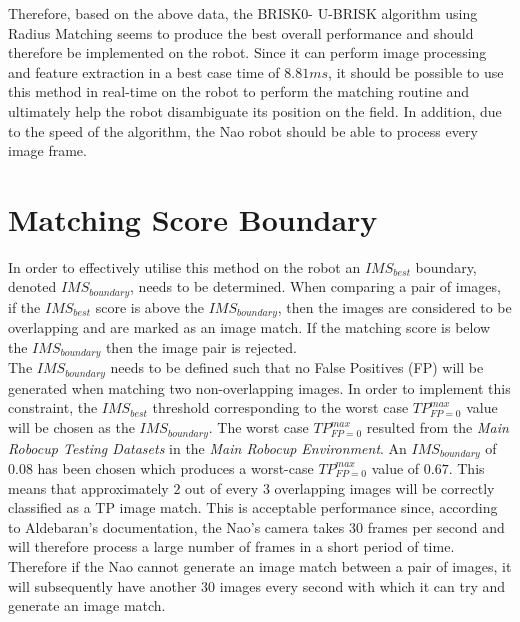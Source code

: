 Therefore, based on the above data, the BRISK0- U-BRISK algorithm using Radius Matching seems to produce the best overall performance and should therefore be implemented on the robot. Since it can perform image processing and feature extraction in a best case time of $8.81 ms$, it should be possible to use this method in real-time on the robot to perform the matching routine and ultimately help the robot disambiguate its position on the field. In addition, due to the speed of the algorithm, the Nao robot should be able to process every image frame.\\

\section{Matching Score Boundary}
\label{sec:matchingScoreBoundary}
In order to effectively utilise this method on the robot an $IMS_{best}$ boundary, denoted $IMS_{boundary}$, needs to be determined. When comparing a pair of images, if the $IMS_{best}$ score is above the $IMS_{boundary}$, then the images are considered to be overlapping and are marked as an image match. If the matching score is below the $IMS_{boundary}$ then the image pair is rejected. \\

The $IMS_{boundary}$ needs to be defined such that no False Positives (FP) will be generated when matching two non-overlapping images. In order to implement this constraint, the $IMS_{best}$ threshold corresponding to the worst case $TP_{FP=0}^{max}$ value will be chosen as the $IMS_{boundary}$. The worst case $TP_{FP=0}^{max}$ resulted from the \textit{Main Robocup Testing Datasets} in the \textit{Main Robocup Environment}. An $IMS_{boundary}$ of $0.08$ has been chosen which produces a worst-case $TP_{FP=0}^{max}$ value of $0.67$. This means that approximately $2$ out of every $3$ overlapping images will be correctly classified as a TP image match. This is acceptable performance since, according to Aldebaran's documentation, the Nao's camera takes $30$ frames per second and will therefore process a large number of frames in a short period of time. Therefore if the Nao cannot generate an image match between a pair of images, it will subsequently have another $30$ images every second with which it can try and generate an image match.\\

